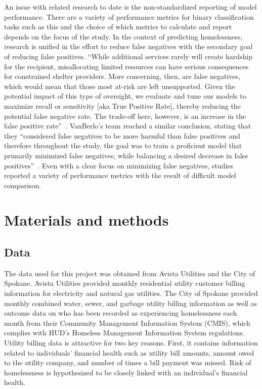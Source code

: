 \documentclass[10pt,letterpaper]{article}
\newcommand{\red}[1]{{\color{red}{#1}}}
\begin{document}
An issue with related research to date is the non-standardized reporting of model performance. There are a variety of performance metrics for binary classification tasks such as this and the choice of which metrics to calculate and report depends on the focus of the study. In the context of predicting homelessness, research is unified in the effort to reduce false negatives with the secondary goal of reducing false positives. ``While  additional  services  rarely  will  create  hardship  for the  recipient,  misallocating  limited  resources  can  have  serious  consequences for constrained shelter providers. More concerning, then, are false negatives, which  would  mean  that  those  most  at-risk  are  left  unsupported.  Given  the potential  impact  of  this  type  of  oversight,  we  evaluate  and  tune  our  models to maximize recall or sensitivity [aka True Positive Rate], thereby reducing the potential false negative rate.  The  trade-off  here,  however,  is  an increase  in  the  false  positive  rate''~\cite{hong2018applications}. VanBerlo's team reached a similar conclusion, stating that they ``considered false negatives to be more harmful than false positives and therefore throughout the study, the goal was to train a proficient model that primarily minimized false negatives, while balancing a desired decrease in false positives''~\cite{vanberlo2021interpretable}. Even with a clear focus on minimizing false negatives, studies reported a variety of performance metrics with the result of difficult model comparison. \red{remove previous paragraph?}

\section*{Materials and methods}
\subsection*{Data}
The data used for this project was obtained from Avista Utilities and the City of Spokane. Avista Utilities provided monthly residential utility customer billing information for electricity and natural gas utilities. The City of Spokane provided monthly combined water, sewer, and garbage utility billing information as well as outcome data on who has been recorded as experiencing homelessness each month from their Community Management Information System (CMIS), which complies with HUD's Homeless Management Information System regulations. Utility billing data is attractive for two key reasons. First, it contains information related to individuals' financial health such as utility bill amounts, amount owed to the utility company, and number of times a bill payment was missed. Risk of homelessness is hypothesized to be closely linked with an individual's financial health.
\end{document}

